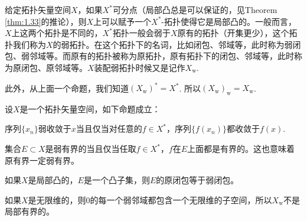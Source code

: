 \begin{para}[拓扑矢量空间的弱拓扑]
给定拓扑矢量空间$X$，如果$X^*$可分点（局部凸总是可以保证的，见Theorem \ref{thm:1.33}的推论），则$X$上可以赋予一个$X^*$-拓扑使得它是局部凸的。一般而言，$X$上这两个拓扑是不同的，$X^*$拓扑一般会弱于$X$原有的拓扑（开集更少），这个拓扑我们称为$X$的弱拓扑。在这个拓扑下的名词，比如闭包、邻域等，此时称为弱闭包、弱邻域等。而原有的拓扑被称为原拓扑，原有拓扑下的闭包、邻域等，此时称为原闭包、原邻域等。$X$装配弱拓扑时候又是记作$X_{\text{w}}$.

此外，从上面一个命题，我们知道$(X_{\text{w}})^*=X^*$. 所以$(X_{\text{w}})_{\text{w}}=X_{\text{w}}$. 
\end{para}

\begin{pro}设$X$是一个拓扑矢量空间，如下命题成立：
\begin{compactenum}[~~~(1)]
\item 序列$\{x_n\}$弱收敛于$x$当且仅当对任意的$f\in X^*$，序列$\{f(x_n)\}$都收敛于$f(x)$.
\item 集合$E\subset X$是弱有界的当且仅当任取$f\in X^*$，$f$在$E$上面都是有界的。这也意味着原有界一定弱有界。
\item 如果$X$是局部凸的，$E$是一个凸子集，则$E$的原闭包等于弱闭包。
\item 如果$X$是无限维的，则$0$的每一个弱邻域都包含一个无限维的子空间，所以$X_{\mathrm{w}}$不是局部有界的。
\end{compactenum}
\end{pro}

